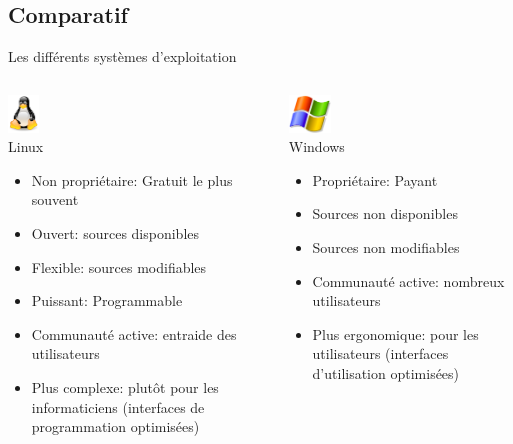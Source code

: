 \subsection{Comparatif}
\begin{frame}{Les différents systèmes d'exploitation}
  \begin{columns}
    \begin{column}{58mm}
      \begin{block}{\center \includegraphics[height=1cm]{img/s01/Tux.png}\\Linux}
        \begin{itemize}
        \item Non propriétaire: Gratuit le plus souvent
        \item Ouvert: sources disponibles
        \item Flexible: sources modifiables
        \item Puissant: Programmable
        \item Communauté active: entraide des utilisateurs
        \item Plus complexe: plutôt pour les informaticiens (interfaces
          de programmation optimisées)
        \end{itemize}
      \end{block}
    \end{column}
    \begin{column}{58mm}
      \begin{block}{\center \includegraphics[height=1cm]{img/s01/Windows_logo.png}\\Windows}
        \begin{itemize}
        \item Propriétaire: Payant
        \item Sources non disponibles
        \item Sources non modifiables
        \item Communauté active: nombreux utilisateurs
        \item Plus ergonomique: pour les utilisateurs (interfaces
          d'utilisation optimisées)
        \end{itemize}

\end{block}
\end{column}
\end{columns}
\end{frame}
